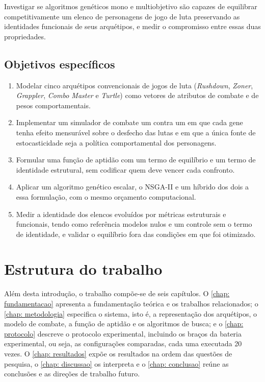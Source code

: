 Investigar se algoritmos genéticos mono e multiobjetivo são capazes de equilibrar competitivamente um elenco de personagens de jogo de luta preservando as identidades funcionais de seus arquétipos, e medir o compromisso entre essas duas propriedades.

\subsection{Objetivos específicos}

\begin{enumerate}
    \item Modelar cinco arquétipos convencionais de jogos de luta (\textit{Rushdown}, \textit{Zoner}, \textit{Grappler}, \textit{Combo Master} e \textit{Turtle}) como vetores de atributos de combate e de pesos comportamentais.
    \item Implementar um simulador de combate um contra um em que cada gene tenha efeito mensurável sobre o desfecho das lutas e em que a única fonte de estocasticidade seja a política comportamental dos personagens.
    \item Formular uma função de aptidão com um termo de equilíbrio e um termo de identidade estrutural, sem codificar quem deve vencer cada confronto.
    \item Aplicar um algoritmo genético escalar, o NSGA-II e um híbrido dos dois a essa formulação, com o mesmo orçamento computacional.
    \item Medir a identidade dos elencos evoluídos por métricas estruturais e funcionais, tendo como referência modelos nulos e um controle sem o termo de identidade, e validar o equilíbrio fora das condições em que foi otimizado.
\end{enumerate}

\section{Estrutura do trabalho}

Além desta introdução, o trabalho compõe-se de seis capítulos. O \autoref{chap: fundamentacao} apresenta a fundamentação teórica e os trabalhos relacionados; o \autoref{chap: metodologia} especifica o sistema, isto é, a representação dos arquétipos, o modelo de combate, a função de aptidão e os algoritmos de busca; e o \autoref{chap: protocolo} descreve o protocolo experimental, incluindo os braços da bateria experimental, ou seja, as configurações comparadas, cada uma executada 20 vezes. O \autoref{chap: resultados} expõe os resultados na ordem das questões de pesquisa, o \autoref{chap: discussao} os interpreta e o \autoref{chap: conclusao} reúne as conclusões e as direções de trabalho futuro.
